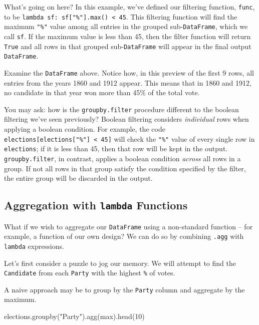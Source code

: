 \documentclass[
  letterpaper,
  DIV=11,
  numbers=noendperiod]{scrreprt}
\newenvironment{Shaded}{\begin{snugshade}}{\end{snugshade}}
\newcommand{\BuiltInTok}[1]{\textcolor[rgb]{0.00,0.23,0.31}{#1}}
\newcommand{\DecValTok}[1]{\textcolor[rgb]{0.68,0.00,0.00}{#1}}
\newcommand{\NormalTok}[1]{\textcolor[rgb]{0.00,0.23,0.31}{#1}}
\newcommand{\StringTok}[1]{\textcolor[rgb]{0.13,0.47,0.30}{#1}}
\begin{document}
What's going on here? In this example, we've defined our filtering
function, \texttt{func}, to be
\texttt{lambda\ sf:\ sf{[}"\%"{]}.max()\ \textless{}\ 45}. This
filtering function will find the maximum \texttt{"\%"} value among all
entries in the grouped sub-\texttt{DataFrame}, which we call
\texttt{sf}. If the maximum value is less than 45, then the filter
function will return \texttt{True} and all rows in that grouped
sub-\texttt{DataFrame} will appear in the final output
\texttt{DataFrame}.

Examine the \texttt{DataFrame} above. Notice how, in this preview of the
first 9 rows, all entries from the years 1860 and 1912 appear. This
means that in 1860 and 1912, no candidate in that year won more than
45\% of the total vote.

You may ask: how is the \texttt{groupby.filter} procedure different to
the boolean filtering we've seen previously? Boolean filtering considers
\emph{individual} rows when applying a boolean condition. For example,
the code \texttt{elections{[}elections{[}"\%"{]}\ \textless{}\ 45{]}}
will check the \texttt{"\%"} value of every single row in
\texttt{elections}; if it is less than 45, then that row will be kept in
the output. \texttt{groupby.filter}, in contrast, applies a boolean
condition \emph{across} all rows in a group. If not all rows in that
group satisfy the condition specified by the filter, the entire group
will be discarded in the output.

\subsection{\texorpdfstring{Aggregation with \texttt{lambda}
Functions}{Aggregation with lambda Functions}}\label{aggregation-with-lambda-functions}

What if we wish to aggregate our \texttt{DataFrame} using a non-standard
function -- for example, a function of our own design? We can do so by
combining \texttt{.agg} with \texttt{lambda} expressions.

Let's first consider a puzzle to jog our memory. We will attempt to find
the \texttt{Candidate} from each \texttt{Party} with the highest
\texttt{\%} of votes.

A naive approach may be to group by the \texttt{Party} column and
aggregate by the maximum.

\begin{Shaded}
\begin{Highlighting}[]
\NormalTok{elections.groupby(}\StringTok{"Party"}\NormalTok{).agg(}\BuiltInTok{max}\NormalTok{).head(}\DecValTok{10}\NormalTok{)}
\end{Highlighting}
\end{Shaded}
\end{document}
